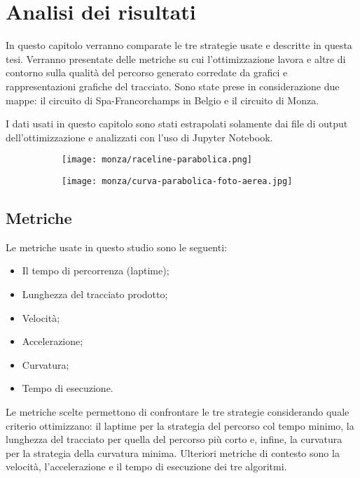 
\chapter{Analisi dei risultati}
In questo capitolo verranno comparate le tre strategie usate e descritte in questa tesi.
Verranno presentate delle metriche su cui l'ottimizzazione lavora e altre di contorno sulla
qualità del percorso generato corredate da grafici e rappresentazioni grafiche del tracciato.
Sono state prese in considerazione due mappe: il circuito di Spa-Francorchamps in Belgio e il circuito di
Monza.

I dati usati in questo capitolo sono stati estrapolati solamente dai file di output dell'ottimizzazione
e analizzati con l'uso di Jupyter Notebook.
\begin{figure}[H]
	\begin{center}
	\begin{subfigure}[l]{0.45\textwidth}
		\texttt{[image: monza/raceline-parabolica.png]}
	\end{subfigure}
	\begin{subfigure}[r]{0.5\textwidth}
		\texttt{[image: monza/curva-parabolica-foto-aerea.jpg]}
	\end{subfigure}
	\end{center}
\end{figure}
\newpage
\section{Metriche}
Le metriche usate in questo studio sono le seguenti:
\begin{itemize}
	\item Il tempo di percorrenza (laptime);
	\item Lunghezza del tracciato prodotto;
	\item Velocità; %
	\item Accelerazione; %
	\item Curvatura; %
	\item Tempo di esecuzione.
\end{itemize}
Le metriche scelte permettono di confrontare le tre strategie considerando quale criterio 
ottimizzano: il laptime per la strategia del percorso col tempo minimo, la lunghezza del tracciato per
quella del percorso più corto e, infine, la curvatura per la strategia della curvatura minima.
Ulteriori metriche di contesto sono la velocità, l'accelerazione e il tempo di esecuzione dei tre
algoritmi.

